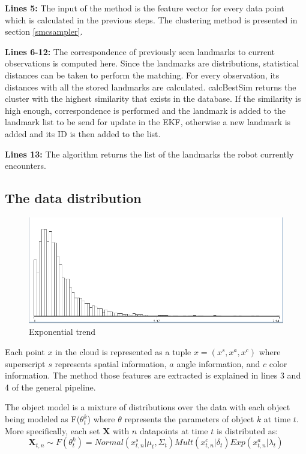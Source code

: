 \documentclass[twoside,hidelinks]{article}
\begin{document}
\textbf{Lines 5:} The input of the method is the feature vector for every data point which is calculated in the previous steps. The clustering method is presented in section \ref{smcsampler}. 

\textbf{Lines 6-12:} The correspondence of previously seen landmarks to current observations is computed here. Since the landmarks are distributions, statistical distances can be taken to perform the matching. For every observation, its distances with all the stored landmarks are calculated. calcBestSim returns the cluster with the highest similarity that exists in the database. If the similarity is high enough, correspondence is performed and the landmark is added to the landmark list to be send for update in the EKF, otherwise a new landmark is added and its ID is then added to the list.

\textbf{Lines 13:} The algorithm returns the list of the landmarks the robot currently encounters.

\subsection{The data distribution}
\label{data:dist}

\begin{figure}
    \centering
    \includegraphics[width=.35\textwidth]{Kullback-Leibler}
    \caption{Exponential trend}
    \label{pcl:kl}
\end{figure}

Each point $x$ in the cloud is represented as a tuple $x =(x^s, x^a, x^c ) $ where superscript $s$ represents spatial information, $a$ angle information, and $c$ color information. The method those features are extracted is explained in lines 3 and 4 of the general pipeline.

The object model is a mixture of distributions over the data with each object being modeled as F($\theta_t^k$) where $\theta$ represents the parameters of object $k$ at time $t$. More specifically, each set \textbf{X} with $n$ datapoints at time $t$ is distributed as:
$$ \textbf{X}_{t,n} \sim F(\theta_t^k) = Normal(x_{t,n}^s| \mu_t, \Sigma_t) Mult(x_{t,n}^c | \delta_t) Exp(x_{t,n}^a | \lambda_t) $$
\end{document}
